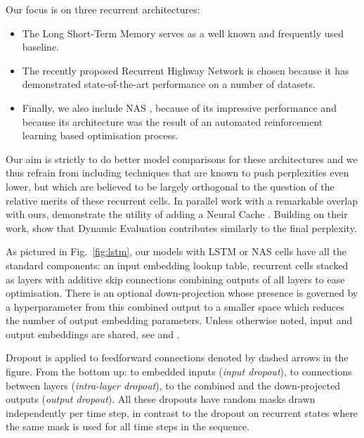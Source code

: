 \documentclass[letter]{article} \usepackage{iclr2018_conference,times}
\begin{document}
Our focus is on three recurrent architectures:
\begin{itemize}
\item The Long Short-Term Memory \citep{hochreiter:1997:lstm} serves
  as a well known and frequently used baseline.
\item The recently proposed Recurrent Highway Network
  \citep{DBLP:journals/corr/ZillySKS16} is chosen because it has
  demonstrated state-of-the-art performance on a number of datasets.
\item Finally, we also include NAS \citep{zoph2016neural}, because of
  its impressive performance and because its architecture was the
  result of an automated reinforcement learning based optimisation
  process.
\end{itemize}
Our aim is strictly to do better model comparisons for these
architectures and we thus refrain from including techniques that are
known to push perplexities even lower, but which are believed to be
largely orthogonal to the question of the relative merits of these
recurrent cells. In parallel work with a remarkable overlap with ours,
\citet{DBLP:journals/corr/abs-1708-02182} demonstrate the utility of
adding a Neural Cache \citep{DBLP:journals/corr/GraveJU16}. Building
on their work, \citet{krause2017dynamic} show that Dynamic Evaluation
\citep{DBLP:journals/corr/Graves13} contributes similarly to the final
perplexity.

As pictured in Fig.~\ref{fig:lstm}, our models with LSTM or NAS cells
have all the standard components: an input embedding lookup table,
recurrent cells stacked as layers with additive skip connections
combining outputs of all layers to ease optimisation. There is an
optional down-projection whose presence is governed by a
hyperparameter from this combined output to a smaller space which
reduces the number of output embedding parameters. Unless otherwise
noted, input and output embeddings are shared, see
\citep{DBLP:journals/corr/InanKS16} and
\citep{DBLP:journals/corr/PressW16}.

Dropout is applied to feedforward connections denoted by dashed arrows
in the figure. From the bottom up: to embedded inputs (\textit{input
  dropout}), to connections between layers (\textit{intra-layer
  dropout}), to the combined and the down-projected outputs
(\textit{output dropout}). All these dropouts have random masks drawn
independently per time step, in contrast to the dropout on recurrent
states where the same mask is used for all time steps in the sequence.
\end{document}
